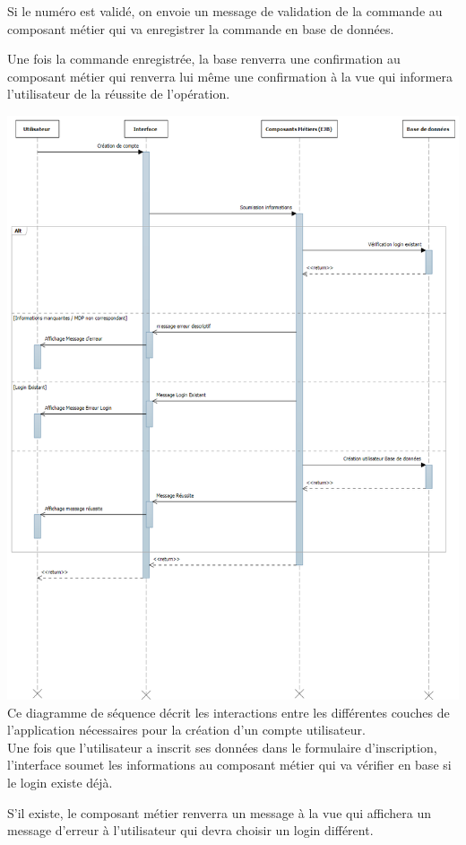 	Si le numéro est validé, on envoie un message de validation de la commande au composant métier qui va enregistrer la commande en base de données.

	Une fois la commande enregistrée, la base renverra une confirmation au composant métier qui renverra lui même une confirmation à la vue qui informera l'utilisateur de la réussite de l'opération.

	\clearpage
	\includegraphics[scale=0.37]{Res/accountCreationSequence.png}
	Ce diagramme de séquence décrit les interactions entre les différentes couches de l'application nécessaires pour la création d'un compte utilisateur. \\

	Une fois que l'utilisateur a inscrit ses données dans le formulaire d'inscription, l'interface soumet les informations au composant métier qui va vérifier en base si le login existe déjà.

	S'il existe, le composant métier renverra un message à la vue qui affichera un message d'erreur à l'utilisateur qui devra choisir un login différent.

